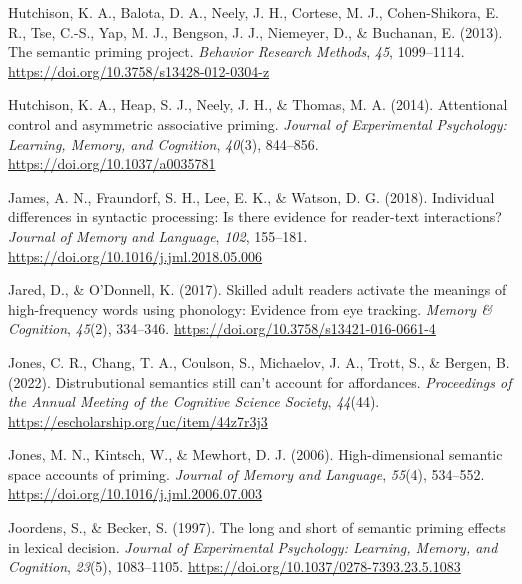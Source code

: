 \documentclass[
  12pt,
  man,floatsintext]{apa7}
\newlength{\cslhangindent}
\newlength{\cslentryspacingunit} %
\newenvironment{CSLReferences}[2] %
 {%
  \setlength{\parindent}{0pt}
  \ifodd #1
  \let\oldpar\par
  \def\par{\hangindent=\cslhangindent\oldpar}
  \fi
  \setlength{\parskip}{#2\cslentryspacingunit}
 }%
 {}
\begin{document}
\begin{CSLReferences}{1}{0}
\leavevmode{}%
Hutchison, K. A., Balota, D. A., Neely, J. H., Cortese, M. J., Cohen-Shikora, E. R., Tse, C.-S., Yap, M. J., Bengson, J. J., Niemeyer, D., \& Buchanan, E. (2013). The semantic priming project. \emph{Behavior Research Methods}, \emph{45}, 1099--1114. \url{https://doi.org/10.3758/s13428-012-0304-z}

\leavevmode{}%
Hutchison, K. A., Heap, S. J., Neely, J. H., \& Thomas, M. A. (2014). Attentional control and asymmetric associative priming. \emph{Journal of Experimental Psychology: Learning, Memory, and Cognition}, \emph{40}(3), 844--856. \url{https://doi.org/10.1037/a0035781}

\leavevmode{}%
James, A. N., Fraundorf, S. H., Lee, E. K., \& Watson, D. G. (2018). Individual differences in syntactic processing: {Is} there evidence for reader-text interactions? \emph{Journal of Memory and Language}, \emph{102}, 155--181. \url{https://doi.org/10.1016/j.jml.2018.05.006}

\leavevmode{}%
Jared, D., \& O'Donnell, K. (2017). Skilled adult readers activate the meanings of high-frequency words using phonology: {Evidence} from eye tracking. \emph{Memory \& Cognition}, \emph{45}(2), 334--346. \url{https://doi.org/10.3758/s13421-016-0661-4}

\leavevmode{}%
Jones, C. R., Chang, T. A., Coulson, S., Michaelov, J. A., Trott, S., \& Bergen, B. (2022). Distrubutional semantics still can't account for affordances. \emph{Proceedings of the Annual Meeting of the Cognitive Science Society}, \emph{44}(44). \url{https://escholarship.org/uc/item/44z7r3j3}

\leavevmode{}%
Jones, M. N., Kintsch, W., \& Mewhort, D. J. (2006). High-dimensional semantic space accounts of priming. \emph{Journal of Memory and Language}, \emph{55}(4), 534--552. \url{https://doi.org/10.1016/j.jml.2006.07.003}

\leavevmode{}%
Joordens, S., \& Becker, S. (1997). The long and short of semantic priming effects in lexical decision. \emph{Journal of Experimental Psychology: Learning, Memory, and Cognition}, \emph{23}(5), 1083--1105. \url{https://doi.org/10.1037/0278-7393.23.5.1083}


\end{CSLReferences}
\end{document}

